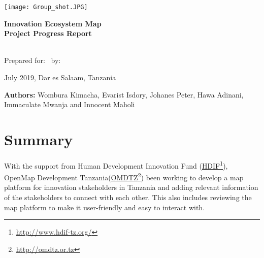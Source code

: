 \documentclass[a4paper,12pt,twoside]{article}
\begin{document}
\thispagestyle{empty}

\begin{center}
\texttt{[image: Group\_shot.JPG]}
\end{center}

\begin{center}
\bigskip
  \Huge 
\color{OMDTZblue} \textbf {Innovation Ecosystem Map}
\\
\textbf{Project Progress Report}
\\
\end{center}
\bigskip \bigskip \bigskip
\\
  \vbox{
  \centering
  Prepared for:
  \
  by:
}
\bigskip  \bigskip \bigskip
\begin{center}
  July 2019, Dar es Salaam, Tanzania  
  
 \bigskip \bigskip \bigskip \bigskip \bigskip \bigskip
\end{center}
 
\begin{flushleft}
	\footnotesize {\textbf{Authors:} Wombura Kimacha, Evarist Isdory, Johanes Peter, Hawa Adinani, Immaculate Mwanja and { } { } { } { } { } { } Innocent Maholi}
\end{flushleft} 
  

\newpage
\tableofcontents

\newpage
\section{Summary}
With the support from Human Development Innovation Fund (\href{http://www.hdif-tz.org/}{HDIF}\footnote{\url{http://www.hdif-tz.org/}}), OpenMap Development Tanzania(\href{http://omdtz.or.tz}{OMDTZ}\footnote{\url{http://omdtz.or.tz}}) been working to develop a map platform for innovation stakeholders in Tanzania and adding relevant information of the stakeholders to connect with each other. This also includes reviewing the map platform to make it user-friendly and easy to interact with. 
\end{document}
